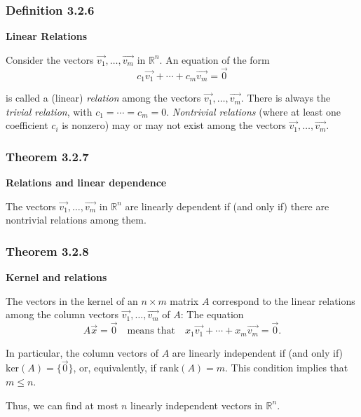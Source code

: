 \documentclass{report}
\begin{document}
\subsubsection*{Definition 3.2.6}
\par\noindent\textbf{Linear Relations}
\par\noindent Consider the vectors $\vec{v_{1}},\ldots{},\vec{v_{m}}$ in $\mathbb{R}^{n}$. An equation of the form
\[c_{1}\vec{v_{1}}+\cdots{}+c_{m}\vec{v_{m}}=\vec{0}\]
\par\noindent is called a (linear) \textit{relation} among the vectors $\vec{v_{1}},\ldots{},\vec{v_{m}}$. There is always the \textit{trivial relation}, with $c_{1}=\cdots{}=c_{m}=0$. \textit{Nontrivial relations} (where at least one coefficient $c_{i}$ is nonzero) may or may not exist among the vectors $\vec{v_{1}},\ldots{},\vec{v_{m}}$.
\subsubsection*{Theorem 3.2.7}
\par\noindent\textbf{Relations and linear dependence}
\par\noindent The vectors $\vec{v_{1}},\ldots{},\vec{v_{m}}$ in $\mathbb{R}^{n}$ are linearly dependent if (and only if) there are nontrivial relations among them.
\subsubsection*{Theorem 3.2.8}
\par\noindent\textbf{Kernel and relations}
\par\noindent The vectors in the kernel of an $n\times{}m$ matrix $A$ correspond to the linear relations among the column vectors $\vec{v_{1}},\ldots{},\vec{v_{m}}$ of $A$: The equation
\[A\vec{x}=\vec{0}\quad\textrm{means that}\quad{}x_{1}\vec{v_{1}}+\cdots{}+x_{m}\vec{v_{m}}=\vec{0}.\]
\par\noindent In particular, the column vectors of $A$ are linearly independent if (and only if) $\textrm{ker}(A)=\{\vec{0}\}$, or, equivalently, if $\textrm{rank}(A)=m$. This condition implies that $m\le{}n$.
\par\noindent Thus, we can find at most $n$ linearly independent vectors in $\mathbb{R}^{n}$.
\end{document}
